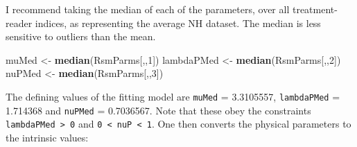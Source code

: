 \documentclass[]{book}
\newenvironment{Shaded}{\begin{snugshade}}{\end{snugshade}}
\newcommand{\CommentTok}[1]{\textcolor[rgb]{0.56,0.35,0.01}{\textit{#1}}}
\newcommand{\ControlFlowTok}[1]{\textcolor[rgb]{0.13,0.29,0.53}{\textbf{#1}}}
\newcommand{\DataTypeTok}[1]{\textcolor[rgb]{0.13,0.29,0.53}{#1}}
\newcommand{\DecValTok}[1]{\textcolor[rgb]{0.00,0.00,0.81}{#1}}
\newcommand{\KeywordTok}[1]{\textcolor[rgb]{0.13,0.29,0.53}{\textbf{#1}}}
\newcommand{\NormalTok}[1]{#1}
\newcommand{\OperatorTok}[1]{\textcolor[rgb]{0.81,0.36,0.00}{\textbf{#1}}}
\newcommand{\StringTok}[1]{\textcolor[rgb]{0.31,0.60,0.02}{#1}}
\begin{document}
\begin{Shaded}
\end{Shaded}

I recommend taking the median of each of the parameters, over all treatment-reader indices, as representing the average NH dataset. The median is less sensitive to outliers than the mean.

\begin{Shaded}
\begin{Highlighting}[]
\NormalTok{muMed <-}\StringTok{ }\KeywordTok{median}\NormalTok{(RsmParms[,,}\DecValTok{1}\NormalTok{]) }
\NormalTok{lambdaPMed <-}\StringTok{ }\KeywordTok{median}\NormalTok{(RsmParms[,,}\DecValTok{2}\NormalTok{])}
\NormalTok{nuPMed <-}\StringTok{ }\KeywordTok{median}\NormalTok{(RsmParms[,,}\DecValTok{3}\NormalTok{])}
\end{Highlighting}
\end{Shaded}

The defining values of the fitting model are \texttt{muMed} = 3.3105557, \texttt{lambdaPMed} = 1.714368 and \texttt{nuPMed} = 0.7036567. Note that these obey the constraints \texttt{lambdaPMed\ \textgreater{}\ 0} and \texttt{0\ \textless{}\ nuP\ \textless{}\ 1}. One then converts the physical parameters to the intrinsic values:
\end{document}
